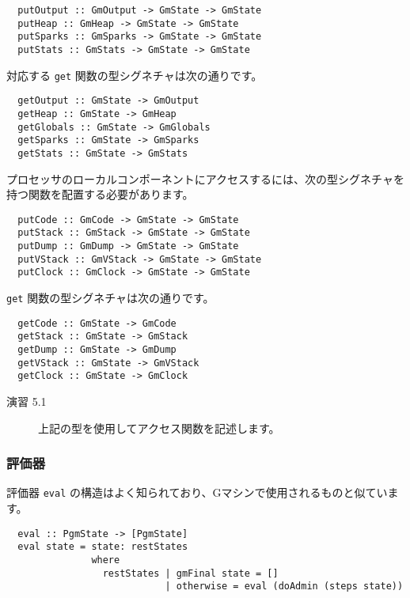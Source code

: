 \documentclass{jarticle}
\begin{document}
\begin{verbatim}
  putOutput :: GmOutput -> GmState -> GmState
  putHeap :: GmHeap -> GmState -> GmState
  putSparks :: GmSparks -> GmState -> GmState
  putStats :: GmStats -> GmState -> GmState
\end{verbatim}

対応する \texttt{get} 関数の型シグネチャは次の通りです。

\begin{verbatim}
  getOutput :: GmState -> GmOutput
  getHeap :: GmState -> GmHeap
  getGlobals :: GmState -> GmGlobals
  getSparks :: GmState -> GmSparks
  getStats :: GmState -> GmStats
\end{verbatim}

プロセッサのローカルコンポーネントにアクセスするには、次の型シグネチャを持つ関数を配置する必要があります。

\begin{verbatim}
  putCode :: GmCode -> GmState -> GmState
  putStack :: GmStack -> GmState -> GmState
  putDump :: GmDump -> GmState -> GmState
  putVStack :: GmVStack -> GmState -> GmState
  putClock :: GmClock -> GmState -> GmState
\end{verbatim}

\texttt{get} 関数の型シグネチャは次の通りです。

\begin{verbatim}
  getCode :: GmState -> GmCode
  getStack :: GmState -> GmStack
  getDump :: GmState -> GmDump
  getVStack :: GmState -> GmVStack
  getClock :: GmState -> GmClock
\end{verbatim}

\begin{description}
	\item[演習 5.1] 上記の型を使用してアクセス関数を記述します。
\end{description}

\subsubsection{評価器}

評価器 \texttt{eval} の構造はよく知られており、Gマシンで使用されるものと似ています。

\begin{verbatim}
  eval :: PgmState -> [PgmState]
  eval state = state: restStates
               where
                 restStates | gmFinal state = []
                            | otherwise = eval (doAdmin (steps state))
\end{verbatim}
\end{document}
